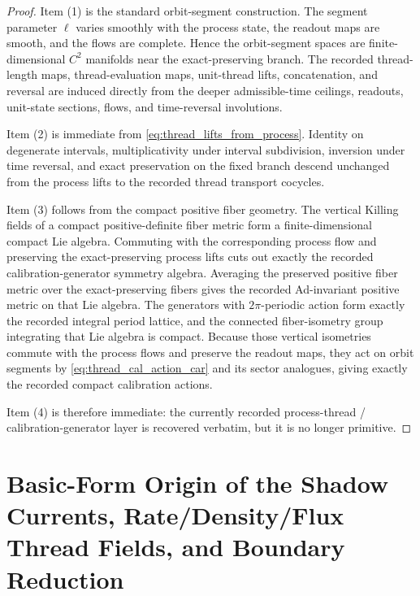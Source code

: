 \documentclass[11pt]{article}
\begin{document}
\begin{proof}
Item (1) is the standard orbit-segment construction. The segment parameter \(\ell\) varies smoothly with the process state, the readout maps are smooth, and the flows are complete. Hence the orbit-segment spaces are finite-dimensional \(C^2\) manifolds near the exact-preserving branch. The recorded thread-length maps, thread-evaluation maps, unit-thread lifts, concatenation, and reversal are induced directly from the deeper admissible-time ceilings, readouts, unit-state sections, flows, and time-reversal involutions.

Item (2) is immediate from \eqref{eq:thread_lifts_from_process}. Identity on degenerate intervals, multiplicativity under interval subdivision, inversion under time reversal, and exact preservation on the fixed branch descend unchanged from the process lifts to the recorded thread transport cocycles.

Item (3) follows from the compact positive fiber geometry. The vertical Killing fields of a compact positive-definite fiber metric form a finite-dimensional compact Lie algebra. Commuting with the corresponding process flow and preserving the exact-preserving process lifts cuts out exactly the recorded calibration-generator symmetry algebra. Averaging the preserved positive fiber metric over the exact-preserving fibers gives the recorded Ad-invariant positive metric on that Lie algebra. The generators with \(2\pi\)-periodic action form exactly the recorded integral period lattice, and the connected fiber-isometry group integrating that Lie algebra is compact. Because those vertical isometries commute with the process flows and preserve the readout maps, they act on orbit segments by \eqref{eq:thread_cal_action_car} and its sector analogues, giving exactly the recorded compact calibration actions.

Item (4) is therefore immediate: the currently recorded process-thread / calibration-generator layer is recovered verbatim, but it is no longer primitive.
\end{proof}

\section{Basic-Form Origin of the Shadow Currents, Rate/Density/Flux Thread Fields, and Boundary Reduction}
\end{document}
